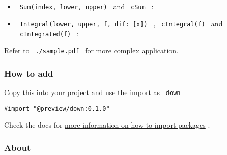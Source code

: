 \begin{itemize}
\tightlist
\item
  \texttt{\ Sum(index,\ lower,\ upper)\ } and \texttt{\ cSum\ } :
\end{itemize}

\begin{Shaded}
\begin{Highlighting}[]
\NormalTok{$}
\NormalTok{$}
\end{Highlighting}
\end{Shaded}

\begin{itemize}
\tightlist
\item
  \texttt{\ Integral(lower,\ upper,\ f,\ dif:\ {[}x{]})\ } ,
  \texttt{\ cIntegral(f)\ } and \texttt{\ cIntegrated(f)\ } :
\end{itemize}

\begin{Shaded}
\begin{Highlighting}[]
\NormalTok{$}
\NormalTok{$}
\end{Highlighting}
\end{Shaded}

Refer to \texttt{\ ./sample.pdf\ } for more complex application.

\subsubsection{How to add}\label{how-to-add}

Copy this into your project and use the import as \texttt{\ down\ }

\begin{verbatim}
#import "@preview/down:0.1.0"
\end{verbatim}



Check the docs for
\href{https://typst.app/docs/reference/scripting/\#packages}{more
information on how to import packages} .

\subsubsection{About}\label{about}

